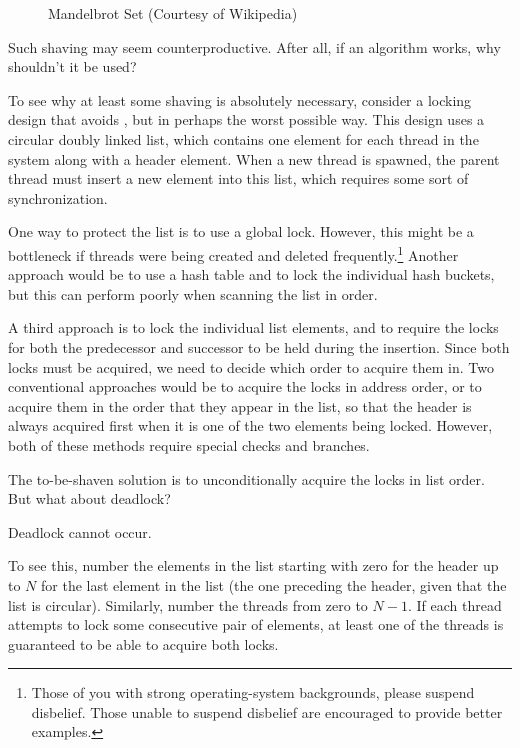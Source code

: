\begin{figure}
\centering
{}
\caption{Mandelbrot Set (Courtesy of Wikipedia)}
\label{fig:easy:Mandelbrot Set}
\end{figure}

Such shaving may seem counterproductive.
After all, if an algorithm works, why shouldn't it be used?

To see why at least some shaving is absolutely necessary, consider
a locking design that avoids , but in perhaps the worst possible way.
This design uses a circular doubly linked list, which contains one
element for each thread in the system along with a header element.
When a new thread is spawned, the parent thread must insert a new
element into this list, which requires some sort of synchronization.

One way to protect the list is to use a global lock.
However, this might be a bottleneck if threads were being created and
deleted frequently.\footnote{
	Those of you with strong operating-system backgrounds, please
	suspend disbelief.
	Those unable to suspend disbelief are encouraged to provide
	better examples.}
Another approach would be to use a hash table and to lock the individual
hash buckets, but this can perform poorly when scanning the list in order.

A third approach is to lock the individual list elements, and to require
the locks for both the predecessor and successor to be held during the
insertion.
Since both locks must be acquired, we need to decide which order to
acquire them in.
Two conventional approaches would be to acquire the locks in address
order, or to acquire them in the order that they appear in the list,
so that the header is always acquired first when it is one of the two
elements being locked.
However, both of these methods require special checks and branches.

The to-be-shaven solution is to unconditionally acquire the locks in
list order.
But what about deadlock?

Deadlock cannot occur.

To see this, number the elements in the list starting with zero for the
header up to $N$ for the last element in the list (the one preceding the
header, given that the list is circular).
Similarly, number the threads from zero to $N-1$.
If each thread attempts to lock some consecutive pair of elements,
at least one of the threads is guaranteed to be able to acquire both
locks.

